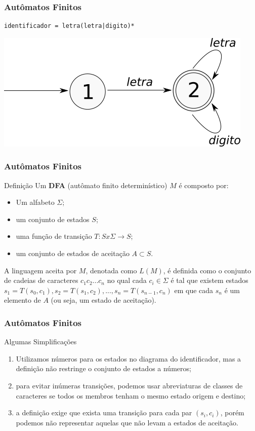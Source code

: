 \documentclass[table]{beamer}
\begin{document}
\begin{frame}[fragile]
   \frametitle{Autômatos Finitos}
   \begin{verbatim}
identificador = letra(letra|digito)*
   \end{verbatim}
   \includegraphics[width=\linewidth,height=\textheight,keepaspectratio]{figuras/automatofinitoidentificadores.png}
\end{frame}

\begin{frame}
   \frametitle{Autômatos Finitos}
   \begin{block}{Definição}
   Um \textbf{DFA} (autômato finito determinístico) $M$ é composto por:
      \begin{itemize}
         \item Um alfabeto $\Sigma$;
	 \item um conjunto de estados $S$;
	 \item uma função de transição $T:S x \Sigma \to S$;
         \item um conjunto de estados de aceitação $A \subset S$.
      \end{itemize}
   A linguagem aceita por $M$, denotada como $L(M)$, é definida como o conjunto de cadeias de caracteres $c_{1}c_{2}...c_{n}$ no qual cada $c_{i} \in \Sigma$ é tal que existem estados $s_{1}=T(s_{0}, c_{1}), s_{2}=T(s_{1}, c_{2}), ... , s_{n}=T(s_{n-1}, c_{n})$ em que cada $s_{n}$ é um elemento de $A$ (ou seja, um estado de aceitação).  
   \end{block}
\end{frame}

\begin{frame}
   \frametitle{Autômatos Finitos}
   \begin{block}{Algumas Simplificações}
      \begin{enumerate}
         \item Utilizamos números para os estados no diagrama do identificador, mas a definição não restringe o conjunto de estados a números;
	 \item para evitar inúmeras transições, podemos usar abreviaturas de classes de caracteres se todos os membros tenham o mesmo estado origem e destino;
	 \item a definição exige que exista uma transição para cada par $(s_{i}, c_{i})$, porém podemos não representar aquelas que não levam a estados de aceitação.
      \end{enumerate}
   \end{block}
\end{frame}
\end{document}
